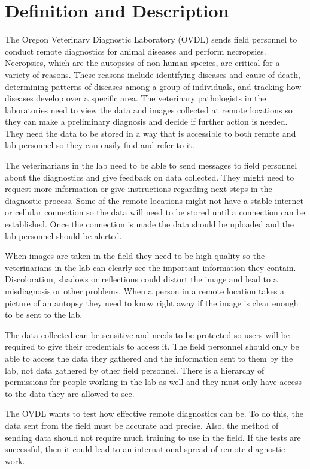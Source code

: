 \documentclass[onecolumn, draftclsnofoot,10pt, compsoc]{IEEEtran}
\begin{document}
\section{Definition and Description}
The Oregon Veterinary Diagnostic Laboratory (OVDL) sends field personnel to conduct remote diagnostics for animal diseases and perform necropsies. Necropsies, which are the autopsies of non-human species, are critical for a variety of reasons. These reasons include identifying diseases and cause of death, determining patterns of diseases among a group of individuals, and tracking how diseases develop over a specific area. The veterinary pathologists in the laboratories need to view the data and images collected at remote locations so they can make a preliminary diagnosis and decide if further action is needed. They need the data to be stored in a way that is accessible to both remote and lab personnel so they can easily find and refer to it.

The veterinarians in the lab need to be able to send messages to field personnel about the diagnostics and give feedback on data collected. They might need to request more information or give instructions regarding next steps in the diagnostic process. Some of the remote locations might not have a stable internet or cellular connection so the data will need to be stored until a connection can be established. Once the connection is made the data should be uploaded and the lab personnel should be alerted. 

When images are taken in the field they need to be high quality so the veterinarians in the lab can clearly see the important information they contain. Discoloration, shadows or reflections could distort the image and lead to a misdiagnosis or other problems. When a person in a remote location takes a picture of an autopsy they need to know right away if the image is clear enough to be sent to the lab. 

The data collected can be sensitive and needs to be protected so users will be required to give their credentials to access it. The field personnel should only be able to access the data they gathered and the information sent to them by the lab, not data gathered by other field personnel. There is a hierarchy of permissions for people working in the lab as well and they must only have access to the data they are allowed to see. 

The OVDL wants to test how effective remote diagnostics can be. To do this, the data sent from the field must be accurate and precise. Also, the method of sending data should not require much training to use in the field. If the tests are successful, then it could lead to an international spread of remote diagnostic work. 
\end{document}
